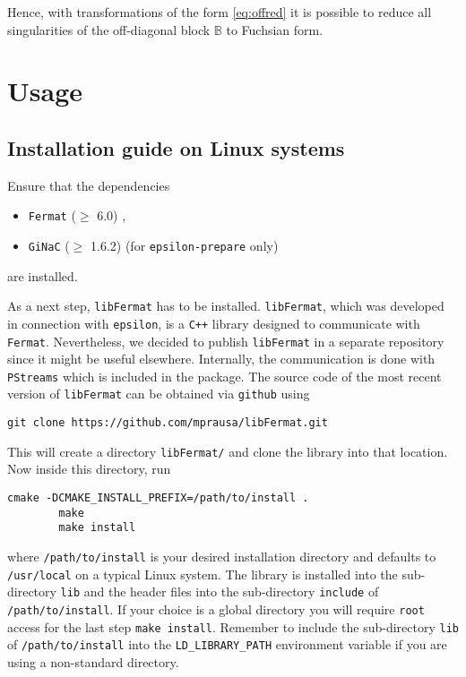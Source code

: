 \documentclass[12pt]{article}
\numberwithin{equation}{section}
\numberwithin{figure}{section}
\newcommand{\B}{\mathds{B}}
\begin{document}
        Hence, with transformations of the form \eqref{eq:offred} it is possible to reduce all singularities of the off-diagonal block $\B$ to Fuchsian form.
  \newpage        
  \section{Usage} \label{sect:usage}
    \subsection{Installation guide on Linux systems}
      Ensure that the dependencies 
      \begin{itemize}
        \item \texttt{Fermat} ($\geq$ 6.0) \cite{Lewis:fermat},
        \item \texttt{GiNaC} ($\geq$ 1.6.2) \cite{Bauer:2000cp} (for \texttt{epsilon-prepare} only)
      \end{itemize}
      are installed.

      As a next step, \texttt{libFermat} has to be installed.
      \texttt{libFermat}, which was developed in connection with \texttt{epsilon}, is a \texttt{C++} library designed to communicate with \texttt{Fermat}.
      Nevertheless, we decided to publish \texttt{libFermat} in a separate repository since it might be useful elsewhere.
      Internally, the communication is done with \texttt{PStreams}\cite{pstreams} which is included in the package.
      The source code of the most recent version of \texttt{libFermat} can be obtained via \texttt{github} using
      \begin{lstlisting}[basicstyle=\ttfamily,xleftmargin=-4em]
        git clone https://github.com/mprausa/libFermat.git
      \end{lstlisting}
      This will create a directory \texttt{libFermat/} and clone the library into that location.
      Now inside this directory, run
      \begin{lstlisting}[basicstyle=\ttfamily,xleftmargin=-4em]
        cmake -DCMAKE_INSTALL_PREFIX=/path/to/install .
        make
        make install
      \end{lstlisting}
      where \texttt{/path/to/install} is your desired installation directory and defaults to \texttt{/usr/local} on a typical Linux system.
      The library is installed into the sub-directory \texttt{lib} and the header files into the sub-directory \texttt{include} of \texttt{/path/to/install}.
      If your choice is a global directory you will require \texttt{root} access for the last step \texttt{make install}.
      Remember to include the sub-directory \texttt{lib} of \texttt{/path/to/install} into the \texttt{LD\_LIBRARY\_PATH} environment variable if you are using a non-standard directory.
      
\end{document}
